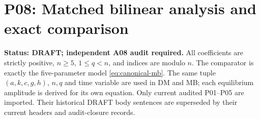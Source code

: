 
\section{P08: Matched bilinear analysis and exact comparison}
\label{sec:P08}
\noindent\textbf{Status: DRAFT; independent A08 audit required.}
All coefficients are strictly positive, $n\ge5$, $1\le q<n$, and indices
are modulo $n$. The comparator is exactly the five-parameter model
\eqref{eq:canonical-mb}. The same tuple $(a,k,c,g,h)$, $n,q$ and time
variable are used in DM and MB; each equilibrium amplitude is derived
for its own equation. Only current audited P01--P05 are imported.
Their historical DRAFT body sentences are superseded by their current
headers and audit-closure records.

